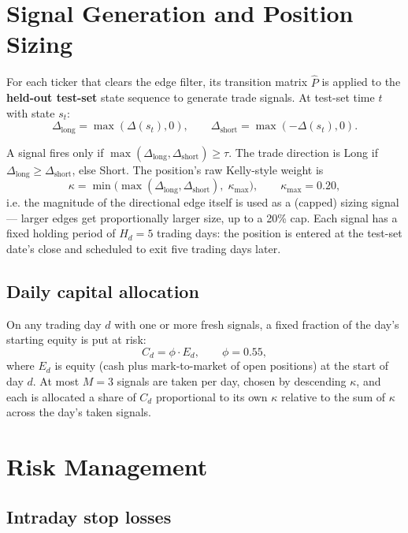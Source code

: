 \documentclass[11pt]{article}
\begin{document}
\section{Signal Generation and Position Sizing}

For each ticker that clears the edge filter, its transition matrix
$\hat P$ is applied to the \textbf{held-out test-set} state sequence to
generate trade signals. At test-set time $t$ with state $s_t$:
\[
  \Delta_{\text{long}} = \max(\Delta(s_t), 0), \qquad
  \Delta_{\text{short}} = \max(-\Delta(s_t), 0).
\]

A signal fires only if $\max(\Delta_{\text{long}}, \Delta_{\text{short}})
\ge \tau$. The trade direction is Long if $\Delta_{\text{long}} \ge
\Delta_{\text{short}}$, else Short. The position's raw Kelly-style weight
is
\[
  \kappa = \min\big(\max(\Delta_{\text{long}}, \Delta_{\text{short}}),\; \kappa_{\max}\big),
  \qquad \kappa_{\max} = 0.20,
\]
i.e. the magnitude of the directional edge itself is used as a
(capped) sizing signal — larger edges get proportionally larger size, up to
a 20\% cap. Each signal has a fixed holding period of $H_d = 5$ trading
days: the position is entered at the test-set date's close and scheduled to
exit five trading days later.

\subsection{Daily capital allocation}

On any trading day $d$ with one or more fresh signals, a fixed fraction of
the day's starting equity is put at risk:
\[
  C_d = \phi \cdot E_d, \qquad \phi = 0.55,
\]
where $E_d$ is equity (cash plus mark-to-market of open positions) at the
start of day $d$. At most $M = 3$ signals are taken per day, chosen by
descending $\kappa$, and each is allocated a share of $C_d$ proportional to
its own $\kappa$ relative to the sum of $\kappa$ across the day's taken
signals.

\section{Risk Management}

\subsection{Intraday stop losses}
\end{document}
